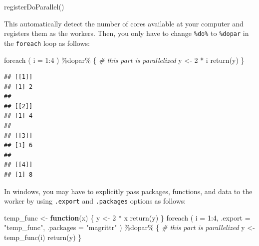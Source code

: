 \documentclass[
]{book}
\newenvironment{Shaded}{\begin{snugshade}}{\end{snugshade}}
\newcommand{\AttributeTok}[1]{\textcolor[rgb]{0.77,0.63,0.00}{#1}}
\newcommand{\CommentTok}[1]{\textcolor[rgb]{0.56,0.35,0.01}{\textit{#1}}}
\newcommand{\ControlFlowTok}[1]{\textcolor[rgb]{0.13,0.29,0.53}{\textbf{#1}}}
\newcommand{\DecValTok}[1]{\textcolor[rgb]{0.00,0.00,0.81}{#1}}
\newcommand{\FunctionTok}[1]{\textcolor[rgb]{0.00,0.00,0.00}{#1}}
\newcommand{\NormalTok}[1]{#1}
\newcommand{\OtherTok}[1]{\textcolor[rgb]{0.56,0.35,0.01}{#1}}
\newcommand{\SpecialCharTok}[1]{\textcolor[rgb]{0.00,0.00,0.00}{#1}}
\newcommand{\StringTok}[1]{\textcolor[rgb]{0.31,0.60,0.02}{#1}}
\begin{document}
\begin{Shaded}
\begin{Highlighting}[]
\FunctionTok{registerDoParallel}\NormalTok{()}
\end{Highlighting}
\end{Shaded}

This automatically detect the number of cores available at your computer and registers them as the workers. Then, you only have to change \texttt{\%do\%} to \texttt{\%dopar} in the \texttt{foreach} loop as follows:

\begin{Shaded}
\begin{Highlighting}[]
\FunctionTok{foreach}\NormalTok{ (}
  \AttributeTok{i =} \DecValTok{1}\SpecialCharTok{:}\DecValTok{4}
\NormalTok{  ) }\SpecialCharTok{\%dopar\%}\NormalTok{ \{}
    \CommentTok{\# this part is parallelized}
\NormalTok{    y }\OtherTok{\textless{}{-}} \DecValTok{2} \SpecialCharTok{*}\NormalTok{ i}
    \FunctionTok{return}\NormalTok{(y)}
\NormalTok{\}}
\end{Highlighting}
\end{Shaded}

\begin{verbatim}
## [[1]]
## [1] 2
## 
## [[2]]
## [1] 4
## 
## [[3]]
## [1] 6
## 
## [[4]]
## [1] 8
\end{verbatim}

In windows, you may have to explicitly pass packages, functions, and data to the worker by using \texttt{.export} and \texttt{.packages} options as follows:

\begin{Shaded}
\begin{Highlighting}[]
\NormalTok{temp\_func }\OtherTok{\textless{}{-}} 
  \ControlFlowTok{function}\NormalTok{(x) \{}
\NormalTok{    y }\OtherTok{\textless{}{-}} \DecValTok{2} \SpecialCharTok{*}\NormalTok{ x}
    \FunctionTok{return}\NormalTok{(y)}
\NormalTok{\}}
\FunctionTok{foreach}\NormalTok{ (}
  \AttributeTok{i =} \DecValTok{1}\SpecialCharTok{:}\DecValTok{4}\NormalTok{, }
  \AttributeTok{.export =} \StringTok{"temp\_func"}\NormalTok{,}
  \AttributeTok{.packages =} \StringTok{"magrittr"}
\NormalTok{  ) }\SpecialCharTok{\%dopar\%}\NormalTok{ \{}
    \CommentTok{\# this part is parallelized}
\NormalTok{    y }\OtherTok{\textless{}{-}} \FunctionTok{temp\_func}\NormalTok{(i)}
    \FunctionTok{return}\NormalTok{(y)}
\NormalTok{\}}
\end{Highlighting}
\end{Shaded}
\end{document}
